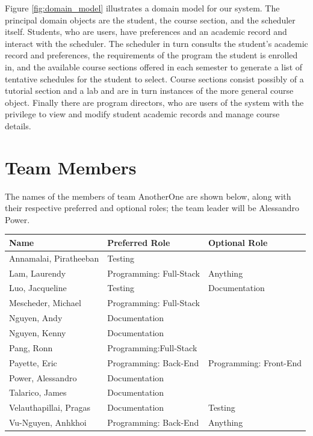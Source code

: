 \documentclass[paper=a4, fontsize=11pt, oneside]{scrartcl} %
\begin{document}
Figure \ref{fig:domain_model} illustrates a domain model for our system. The principal domain objects are the student, the course section, and the scheduler itself. Students, who are users, have preferences and an academic record and interact with the scheduler. The scheduler in turn consults the student's academic record and preferences, the requirements of the program the student is enrolled in, and the available course sections offered in each semester to generate a list of tentative schedules for the student to select. Course sections consist possibly of a tutorial section and a lab and are in turn instances of the more general course object. Finally there are program directors, who are users of the system with the privilege to view and modify student academic records and manage course details.

\section*{Team Members}
The names of the members of team AnotherOne are shown below, along with their respective preferred and optional roles; the team leader will be Alessandro Power.

\begin{tabular} { l l l }
Name & Preferred Role & Optional Role \\ \hline \hline
Annamalai, Piratheeban  & Testing &    \\
Lam, Laurendy  & Programming: Full-Stack & Anything   \\
Luo, Jacqueline  & Testing & Documentation   \\
Mescheder, Michael & Programming: Full-Stack &    \\
Nguyen, Andy  & Documentation &    \\
Nguyen, Kenny  & Documentation &    \\
Pang, Ronn  & Programming:Full-Stack &  \\
Payette, Eric  & Programming: Back-End & Programming: Front-End   \\
Power, Alessandro  & Documentation &    \\
Talarico, James  & Documentation &   \\
Velauthapillai, Pragas & Documentation & Testing   \\
Vu-Nguyen, Anhkhoi  & Programming: Back-End & Anything  
\end{tabular}
\end{document}
